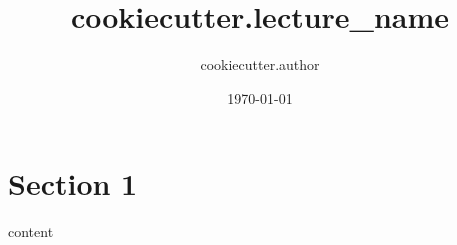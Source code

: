 \documentclass{latex4ei/latex4ei_sheet}
\title{ {{cookiecutter.lecture_name}} }
\author{ {{cookiecutter.author}} }
\date{\today}
\begin{document}
\section{Section 1}
\begin{sectionbox}
	content
\end{sectionbox}
\end{document}

